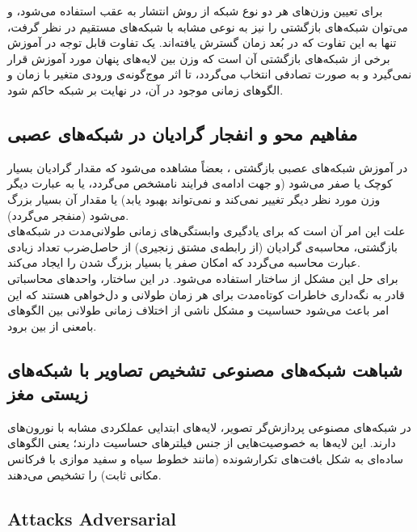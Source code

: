 \documentclass[a4paper]{article}
\begin{document}
	برای تعیین وزن‌های هر دو نوع شبکه از روش انتشار به عقب  استفاده می‌شود، و می‌توان شبکه‌های بازگشتی را نیز به نوعی مشابه با شبکه‌های مستقیم در نظر گرفت، تنها به این تفاوت که در بُعد زمان گسترش یافته‌اند. یک تفاوت قابل توجه در آموزش برخی از شبکه‌های بازگشتی 
	آن است که وزن بین لایه‌های پنهان مورد آموزش قرار نمی‌گیرد و به صورت تصادفی انتخاب می‌گردد، تا اثر موج‌گونه‌ی ورودی متغیر با  زمان و الگوهای زمانی موجود در آن، در نهایت بر شبکه حاکم شود.
	\subsection{مفاهیم محو و انفجار گرادیان در شبکه‌های عصبی}
	در آموزش شبکه‌های عصبی بازگشتی ، بعضاً مشاهده می‌شود که مقدار گرادیان  بسیار کوچک یا صفر می‌شود (و جهت ادامه‌ی فرایند نامشخص می‌گردد، یا به عبارت دیگر وزن مورد نظر دیگر تغییر نمی‌کند و نمی‌تواند بهبود یابد) یا مقدار آن بسیار بزرگ می‌شود (منفجر می‌گردد).\\
	علت این امر آن است که برای یادگیری وابستگی‌های زمانی طولانی‌مدت در شبکه‌های بازگشتی، محاسبه‌ی گرادیان (از رابطه‌ی مشتق زنجیری) از حاصل‌ضرب تعداد زیادی عبارت محاسبه می‌گردد که امکان صفر یا بسیار بزرگ شدن را ایجاد می‌کند.\\
	
	برای حل این مشکل از ساختار 
	استفاده می‌شود. در این ساختار، واحدهای محاسباتی قادر به نگه‌داری خاطرات کوتاه‌مدت برای هر زمان طولانی و دل‌خواهی هستند که این امر باعث می‌شود حساسیت و مشکل ناشی از اختلاف زمانی طولانی بین الگوهای بامعنی از بین برود.
	
	\subsection{شباهت شبکه‌های مصنوعی تشخیص تصاویر با شبکه‌های زیستی مغز}
	در شبکه‌های مصنوعی پردازش‌گر تصویر، لایه‌های ابتدایی عملکردی مشابه با نورون‌های 
	دارند. این لایه‌ها به خصوصیت‌هایی از جنس فیلترهای  حساسیت دارند؛ یعنی الگوهای ساده‌ای به شکل بافت‌های تکرارشونده (مانند خطوط سیاه و سفید موازی با فرکانس مکانی ثابت) را تشخیص می‌دهند.
	
	\subsection{Attacks Adversarial}
	
\end{document}
